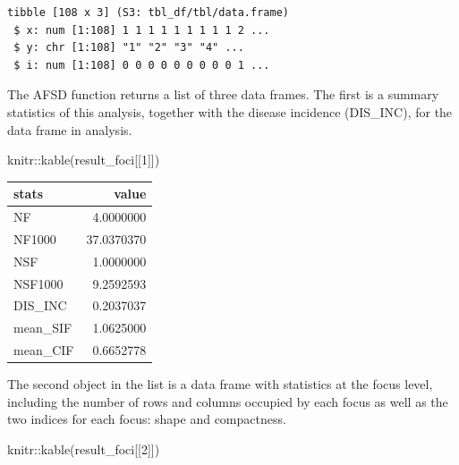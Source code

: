 \documentclass[
  letterpaper,
  DIV=11,
  numbers=noendperiod]{scrreprt}
\newenvironment{Shaded}{\begin{snugshade}}{\end{snugshade}}
\newcommand{\CommentTok}[1]{\textcolor[rgb]{0.37,0.37,0.37}{#1}}
\newcommand{\DecValTok}[1]{\textcolor[rgb]{0.68,0.00,0.00}{#1}}
\newcommand{\FunctionTok}[1]{\textcolor[rgb]{0.28,0.35,0.67}{#1}}
\newcommand{\NormalTok}[1]{\textcolor[rgb]{0.00,0.23,0.31}{#1}}
\newcommand{\OtherTok}[1]{\textcolor[rgb]{0.00,0.23,0.31}{#1}}
\newcommand{\SpecialCharTok}[1]{\textcolor[rgb]{0.37,0.37,0.37}{#1}}
\begin{document}
\begin{verbatim}
tibble [108 x 3] (S3: tbl_df/tbl/data.frame)
 $ x: num [1:108] 1 1 1 1 1 1 1 1 1 2 ...
 $ y: chr [1:108] "1" "2" "3" "4" ...
 $ i: num [1:108] 0 0 0 0 0 0 0 0 0 1 ...
\end{verbatim}

\begin{Shaded}
\end{Shaded}

The AFSD function returns a list of three data frames. The first is a
summary statistics of this analysis, together with the disease incidence
(DIS\_INC), for the data frame in analysis.

\begin{Shaded}
\begin{Highlighting}[]
\NormalTok{knitr}\SpecialCharTok{::}\FunctionTok{kable}\NormalTok{(result\_foci[[}\DecValTok{1}\NormalTok{]])}
\end{Highlighting}
\end{Shaded}

\begin{longtable}[]{@{}lr@{}}
\toprule\noalign{}
stats & value \\
\midrule\noalign{}
\endhead
\bottomrule\noalign{}
\endlastfoot
NF & 4.0000000 \\
NF1000 & 37.0370370 \\
NSF & 1.0000000 \\
NSF1000 & 9.2592593 \\
DIS\_INC & 0.2037037 \\
mean\_SIF & 1.0625000 \\
mean\_CIF & 0.6652778 \\
\end{longtable}

The second object in the list is a data frame with statistics at the
focus level, including the number of rows and columns occupied by each
focus as well as the two indices for each focus: shape and compactness.

\begin{Shaded}
\begin{Highlighting}[]
\NormalTok{knitr}\SpecialCharTok{::}\FunctionTok{kable}\NormalTok{(result\_foci[[}\DecValTok{2}\NormalTok{]])}
\end{Highlighting}
\end{Shaded}
\end{document}
